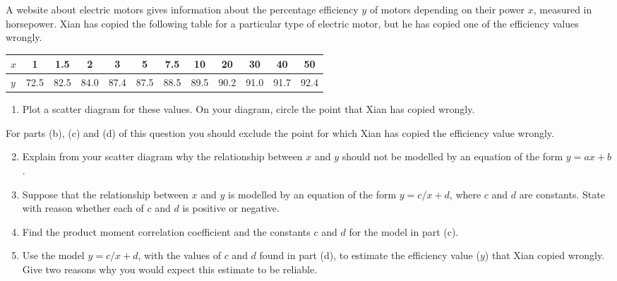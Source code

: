 \begin{problem}
    A website about electric motors gives information about the percentage efficiency $y$ of motors depending on their power $x$, measured in horsepower. Xian has copied the following table for a particular type of electric motor, but he has copied one of the efficiency values wrongly.

    \begin{table}[H]
        \centering
        \begin{tabular}{|l|c|c|c|c|c|c|c|c|c|c|c|}
        \hline
        $x$ & 1 & 1.5 & 2 & 3 & 5 & 7.5 & 10 & 20 & 30 & 40 & 50 \\ \hline
        $y$ & 72.5 & 82.5 & 84.0 & 87.4 & 87.5 & 88.5 & 89.5 & 90.2 & 91.0 & 91.7 & 92.4 \\ \hline
        \end{tabular}
    \end{table}

    \begin{enumerate}
        \item Plot a scatter diagram for these values. On your diagram, circle the point that Xian has copied wrongly.
    \end{enumerate}

    For parts (b), (c) and (d) of this question you should exclude the point for which Xian has copied the efficiency value wrongly.

    \begin{enumerate}
        \setcounter{enumi}{1}
        \item Explain from your scatter diagram why the relationship between $x$ and $y$ should not be modelled by an equation of the form $y=ax+b$.
        \item Suppose that the relationship between $x$ and $y$ is modelled by an equation of the form $y= c/x + d$, where $c$ and $d$ are constants. State with reason whether each of $c$ and $d$ is positive or negative.
        \item Find the product moment correlation coefficient and the constants $c$ and $d$ for the model in part (c).
        \item Use the model $y= c/x + d$, with the values of $c$ and $d$ found in part (d), to estimate the efficiency value ($y$) that Xian copied wrongly. Give two reasons why you would expect this estimate to be reliable.
    \end{enumerate}
\end{problem}
